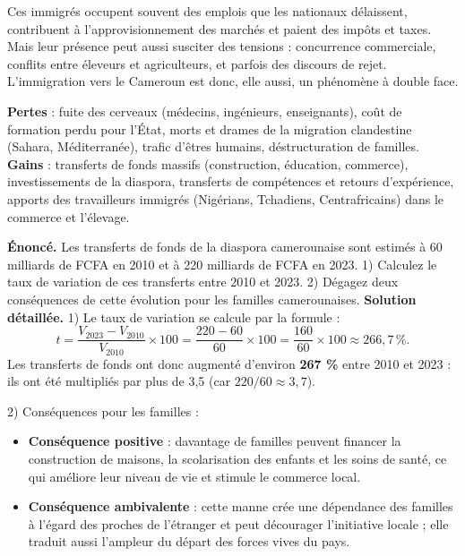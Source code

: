 \documentclass[11pt]{article}
\newcommand{\cle}[1]{{\popxbold\color{popdark}#1}}
\newcounter{popsec}
\newcounter{popsub}
\newcommand{\courssub}[1]{%
  \stepcounter{popsub}%
  \par\vspace{9pt}\noindent{\popxbold\fontsize{11.5}{13}\selectfont\color{popink}{\color{poporange}\thepopsec.\thepopsub}\hspace{6pt}#1}\par\nopagebreak\vspace{4pt}
}
\begin{document}
Ces immigrés occupent souvent des emplois que les nationaux délaissent, contribuent à l'approvisionnement des marchés et paient des impôts et taxes. Mais leur présence peut aussi susciter des tensions : concurrence commerciale, conflits entre éleveurs et agriculteurs, et parfois des discours de rejet. L'immigration vers le Cameroun est donc, elle aussi, un phénomène à double face.

\courssub{Bilan et application}

\begin{aretenir}
\textbf{Pertes} : fuite des cerveaux (médecins, ingénieurs, enseignants), coût de formation perdu pour l'État, morts et drames de la migration clandestine (Sahara, Méditerranée), trafic d'êtres humains, déstructuration de familles.
\textbf{Gains} : transferts de fonds massifs (construction, éducation, commerce), investissements de la diaspora, transferts de compétences et retours d'expérience, apports des travailleurs immigrés (Nigérians, Tchadiens, Centrafricains) dans le commerce et l'élevage.
\end{aretenir}

\begin{exoresolu}
\textbf{Énoncé.} Les transferts de fonds de la diaspora camerounaise sont estimés à 60 milliards de FCFA en 2010 et à 220 milliards de FCFA en 2023. 1) Calculez le taux de variation de ces transferts entre 2010 et 2023. 2) Dégagez deux conséquences de cette évolution pour les familles camerounaises.
\tcblower
\textbf{Solution détaillée.}
1) Le taux de variation se calcule par la formule :
\[
t = \frac{V_{2023} - V_{2010}}{V_{2010}} \times 100 = \frac{220 - 60}{60} \times 100 = \frac{160}{60} \times 100 \approx 266,7\,\%.
\]
Les transferts de fonds ont donc augmenté d'environ \textbf{267 \%} entre 2010 et 2023 : ils ont été multipliés par plus de 3,5 (car $220 / 60 \approx 3,7$).

2) Conséquences pour les familles :
\begin{itemize}
\item \textbf{Conséquence positive} : davantage de familles peuvent financer la construction de maisons, la scolarisation des enfants et les soins de santé, ce qui améliore leur niveau de vie et stimule le commerce local.
\item \textbf{Conséquence ambivalente} : cette manne crée une \cle{dépendance} des familles à l'égard des proches de l'étranger et peut décourager l'initiative locale ; elle traduit aussi l'ampleur du départ des forces vives du pays.
\end{itemize}
\end{exoresolu}
\end{document}
